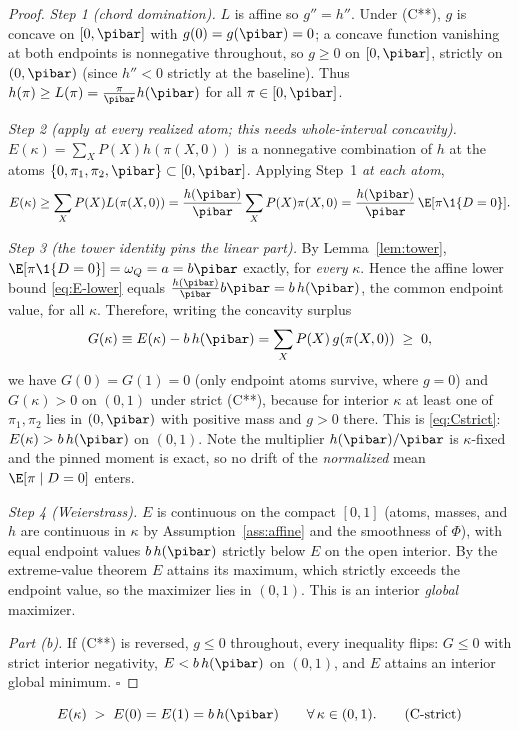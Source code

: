 \begin{proof}
\emph{Step 1 (chord domination).} $L$ is affine so $g''=h''$. Under (C**),
$g$ is concave on $[0,\pibar]$ with $g(0)=g(\pibar)=0$; a concave function
vanishing at both endpoints is nonnegative throughout, so $g\ge0$ on
$[0,\pibar]$, strictly on $(0,\pibar)$ (since $h''<0$ strictly at the baseline).
Thus $h(\pi)\ge L(\pi)=\frac{\pi}{\pibar}h(\pibar)$ for all $\pi\in[0,\pibar]$.

\emph{Step 2 (apply at every realized atom; this needs whole-interval
concavity).} $E(\kappa)=\sum_X P(X)h(\pi(X,0))$ is a nonnegative combination of
$h$ at the atoms $\{0,\pi_1,\pi_2,\pibar\}\subset[0,\pibar]$. Applying Step~1
\emph{at each atom},
\begin{equation}
  E(\kappa)\ge\sum_X P(X)L(\pi(X,0))
  =\frac{h(\pibar)}{\pibar}\sum_X P(X)\pi(X,0)
  =\frac{h(\pibar)}{\pibar}\,\E[\pi\1\{D=0\}].
  \label{eq:E-lower}
\end{equation}

\emph{Step 3 (the tower identity pins the linear part).} By
Lemma~\ref{lem:tower}, $\E[\pi\1\{D=0\}]=\omega_Q=a=b\pibar$ exactly, for
\emph{every} $\kappa$. Hence the affine lower bound \eqref{eq:E-lower} equals
$\frac{h(\pibar)}{\pibar}b\pibar=b\,h(\pibar)$, the common endpoint value, for
all $\kappa$. Therefore, writing the concavity surplus
\begin{equation}
  G(\kappa)\equiv E(\kappa)-b\,h(\pibar)=\sum_X P(X)\,g(\pi(X,0))\;\ge\;0,
  \label{eq:Gsurplus}
\end{equation}
we have $G(0)=G(1)=0$ (only endpoint atoms survive, where $g=0$) and
$G(\kappa)>0$ on $(0,1)$ under strict (C**), because for interior $\kappa$ at
least one of $\pi_1,\pi_2$ lies in $(0,\pibar)$ with positive mass and
$g>0$ there. This is \eqref{eq:Cstrict}: $E(\kappa)>b\,h(\pibar)$ on $(0,1)$.
Note the multiplier $h(\pibar)/\pibar$ is $\kappa$-fixed and the pinned moment
is exact, so no drift of the \emph{normalized} mean $\E[\pi\mid D=0]$ enters.

\emph{Step 4 (Weierstrass).} $E$ is continuous on the compact $[0,1]$ (atoms,
masses, and $h$ are continuous in $\kappa$ by Assumption~\ref{ass:affine} and
the smoothness of $\Phi$), with equal endpoint values $b\,h(\pibar)$ strictly
below $E$ on the open interior. By the extreme-value theorem $E$ attains its
maximum, which strictly exceeds the endpoint value, so the maximizer lies in
$(0,1)$. This is an interior \emph{global} maximizer.

\emph{Part (b).} If (C**) is reversed, $g\le0$ throughout, every inequality
flips: $G\le0$ with strict interior negativity, $E<b\,h(\pibar)$ on $(0,1)$,
and $E$ attains an interior global minimum. \hfill$\square$
\end{proof}
\begin{equation}
  E(\kappa)\;>\;E(0)=E(1)=b\,h(\pibar)\qquad\forall\,\kappa\in(0,1).
  \tag{C-strict}\label{eq:Cstrict}
\end{equation}

